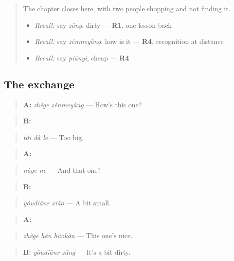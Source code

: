 \begin{quote}
The chapter closes here, with two people shopping and not finding it.

\begin{itemize}
\raggedright
  \item \emph{Recall:} say \emph{zāng}, dirty — \textbf{R1}, one lesson back
  \item \emph{Recall:} say \emph{zěnmeyàng}, how is it — \textbf{R4}, recognition at distance
  \item \emph{Recall:} say \emph{piányi}, cheap — \textbf{R4}
\end{itemize}
\end{quote}

\subsection*{The exchange}
\begin{quote}
\textbf{A:} \emph{zhège zěnmeyàng} — How's this one?
\end{quote}

\begin{quote}
\textbf{B:} 
\end{quote}

\begin{quote}
\emph{tài dà le} — Too big.
\end{quote}

\begin{quote}
\textbf{A:} 
\end{quote}

\begin{quote}
\emph{nàge ne} — And that one?
\end{quote}

\begin{quote}
\textbf{B:} 
\end{quote}

\begin{quote}
\emph{yǒudiǎnr xiǎo} — A bit small.
\end{quote}

\begin{quote}
\textbf{A:} 
\end{quote}

\begin{quote}
\emph{zhège hěn hǎokàn} — This one's nice.
\end{quote}

\begin{quote}
\textbf{B:} \emph{yǒudiǎnr zāng} — It's a bit dirty.
\end{quote}

